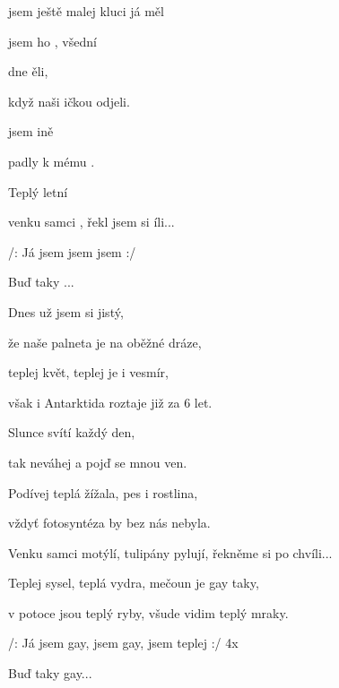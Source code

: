 

\zs
{} jsem ještě  malej 
kluci já měl 

 jsem ho ,  všední 

 dne ěli,

když naši ičkou odjeli.

 jsem ině 

 padly k mému .

Teplý letní 

venku samci , řekl jsem si íli... 
\ks

\zr
/: Já jsem  jsem  jsem  :/

Buď taky ...
\kr

\zs
Dnes už jsem si jistý,

že naše palneta je na oběžné dráze,

teplej květ, teplej je i vesmír,

však i Antarktida roztaje již za 6 let.

Slunce svítí každý den,

tak neváhej a pojď se mnou ven.

Podívej teplá žížala, pes i rostlina,

vždyť fotosyntéza by bez nás nebyla.

Venku samci motýlí, tulipány pylují, řekněme si po chvíli...
\ks

\zr  \kr

\zs
Teplej sysel, teplá vydra, mečoun je gay taky,

v potoce jsou teplý ryby, všude vidim teplý mraky.
\ks

\zr
/: Já jsem gay, jsem gay, jsem teplej :/ 4x

Buď taky gay...
\kr

\kp




















